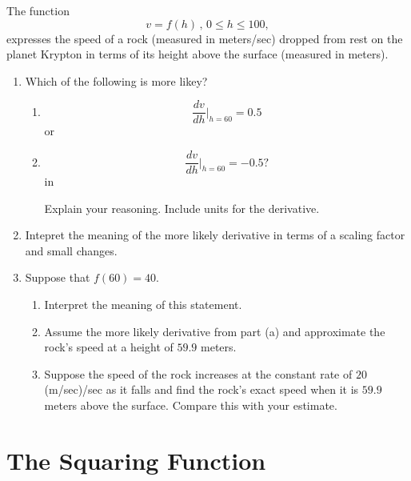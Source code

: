 \documentclass{ximera}
\newcommand{\pskip}{\vskip 0.1 in}
\begin{document}
\begin{example} \label{Ex8df8334df}
The function
\[
   v= f(h) \, , \, 0\leq h \leq 100 ,
\]
expresses the speed of a rock (measured in meters/sec) dropped from rest on the planet Krypton in terms of its height above the surface (measured in meters).

\begin{enumerate}
\item Which of the following is more likey?

\begin{enumerate}
\item 
\[
  \frac{dv}{dh}\Big|_{h=60} = 0.5
\]
or 
\item 
\[
  \frac{dv}{dh}\Big|_{h=60} = -0.5 ?
\]
\pskip

Explain your reasoning. Include units for the derivative.

\end{enumerate}

\item Intepret the meaning of the more likely derivative in terms of a scaling factor and small changes.

\item Suppose that $f(60) = 40$.

\begin{enumerate}
\item Interpret the meaning of this statement.

\item Assume the more likely derivative from part (a) and approximate the rock's speed at a height of $59.9$ meters.

\item Suppose the speed of the rock increases at the constant rate of $20$ (m/sec)/sec as it falls and find the rock's exact speed when it is $59.9$ meters above the surface. Compare this with your estimate.
\end{enumerate}

\end{enumerate}
\end{example}


\section{The Squaring Function}
\end{document}
